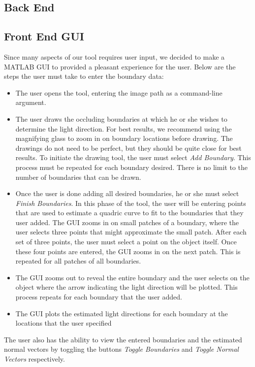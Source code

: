 \documentclass[10pt,twocolumn,letterpaper]{article}
\begin{document}
\subsection{Back End}

\subsection{Front End GUI}
Since many aspects of our tool requires user input, we decided to make a MATLAB GUI to provided a pleasant experience for the user. Below are the steps the user must take to enter the boundary data:
\begin{itemize}
\item The user opens the tool, entering the image path as a command-line argument.
\item The user draws the occluding boundaries at which he or she wishes to determine the light direction. For best results, we recommend using the magnifying glass to zoom in on boundary locations before drawing. The drawings do not need to be perfect, but they should be quite close for best results. To initiate the drawing tool, the user must select \emph{Add Boundary}. This process must be repeated for each boundary desired. There is no limit to the number of boundaries that can be drawn.
\item Once the user is done adding all desired boundaries, he or she must select \emph{Finish Boundaries}. In this phase of the tool, the user will be entering points that are used to estimate a quadric curve to fit to the boundaries that they user added. The GUI zooms in on small patches of a boundary, where the user selects three points that might approximate the small patch. After each set of three points, the user must select a point on the object itself. Once these four points are entered, the GUI zooms in on the next patch. This is repeated for all patches of all boundaries.
\item The GUI zooms out to reveal the entire boundary and the user selects on the object where the arrow indicating the light direction will be plotted. This process repeats for each boundary that the user added.
\item The GUI plots the estimated light directions for each boundary at the locations that the user specified
\end{itemize}
The user also has the ability to view the entered boundaries and the estimated normal vectors by toggling the buttons \emph{Toggle Boundaries} and \emph{Toggle Normal Vectors} respectively. 
\end{document}
